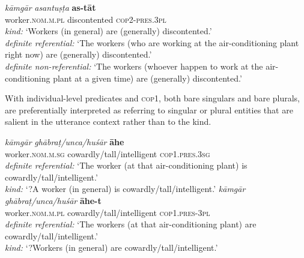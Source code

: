 \documentclass[output=paper,hidelinks]{langscibook}
\begin{document}
\begin{exe}
\begin{xlist}
\ea
\gll \emph{kāmgār} \emph{asantu\d{s}ṭa} \textbf{as-tāt}\\
 worker.\textsc{nom.m.pl} discontented \textsc{cop2-pres.3pl}\\
\glt \emph{kind:} `Workers (in general) are (generally) discontented.'\\
\emph{definite referential:} `The workers (who are working at the air-conditioning plant right now) are (generally) discontented.'\\
\emph{definite non-referential:} `The workers (whoever happen to work at the air-conditioning plant at a given time) are (generally) discontented.' \label{workers2}
\z
{}

With individual-level predicates and \textsc{cop1}, both bare singulars and bare plurals, are preferentially interpreted as referring to singular or plural entities that are salient in the utterance context rather than to the kind.

\ea \label{indcop2}
\begin{xlist} 
\ex
\gll \emph{kāmgār} \emph{ghābraṭ/unca/hu\'{s}ār} \textbf{{ā}he}\\
worker.\textsc{nom.m.sg} cowardly/tall/intelligent \textsc{cop1.pres.3sg}\\
\glt
\emph{definite referential:} `The worker (at that air-conditioning plant) is cowardly/tall/intelligent.'\\
\emph{kind:} `?A worker (in general) is cowardly/tall/intelligent.'
\ex
\gll \emph{kāmgār} \emph{ghābraṭ/unca/hu\'{s}ār} \textbf{{ā}he-t}\\
worker.\textsc{nom.m.pl} cowardly/tall/intelligent \textsc{cop1.pres-3pl}\\
\glt \emph{definite referential:} `The workers (at that air-conditioning plant) are cowardly/tall/intelligent.'\\
\emph{kind:} `?Workers (in general) are cowardly/tall/intelligent.'
\z
\z
{}


\end{xlist}
\end{xlist}
\end{exe}
\end{document}
